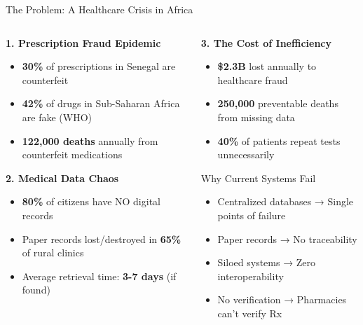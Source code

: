 \documentclass[aspectratio=169,xcolor=dvipsnames,20pt]{beamer}
\newcommand{\crossitem}{\item[\color{DangerRed}\faTimesCircle]}
\begin{document}
\begin{frame}{The Problem: A Healthcare Crisis in Africa}

  \begin{columns}[T]
    \begin{column}{0.5\textwidth}
      \textbf{\textcolor{DangerRed}{1. Prescription Fraud Epidemic}}
      \begin{itemize}
        \item \textcolor{DangerRed}{\textbf{30\%}} of prescriptions in Senegal are counterfeit
        \item \textcolor{DangerRed}{\textbf{42\%}} of drugs in Sub-Saharan Africa are fake (WHO)
        \item \textcolor{DangerRed}{\textbf{122,000 deaths}} annually from counterfeit medications
      \end{itemize}

      \vspace{0.3cm}

      \textbf{\textcolor{WarningOrange}{2. Medical Data Chaos}}
      \begin{itemize}
        \item \textbf{80\%} of citizens have NO digital records
        \item Paper records lost/destroyed in \textbf{65\%} of rural clinics
        \item Average retrieval time: \textbf{3-7 days} (if found)
      \end{itemize}
    \end{column}

    \begin{column}{0.5\textwidth}
      \textbf{\textcolor{DangerRed}{3. The Cost of Inefficiency}}
      \begin{itemize}
        \item \textbf{\$2.3B} lost annually to healthcare fraud
        \item \textbf{250,000} preventable deaths from missing data
        \item \textbf{40\%} of patients repeat tests unnecessarily
      \end{itemize}

      \vspace{0.5cm}

      \begin{block}{Why Current Systems Fail}
        \begin{itemize}
          \crossitem Centralized databases → Single points of failure
          \crossitem Paper records → No traceability
          \crossitem Siloed systems → Zero interoperability
          \crossitem No verification → Pharmacies can't verify Rx
        \end{itemize}
      \end{block}
    \end{column}
  \end{columns}


\end{frame}
\end{document}
